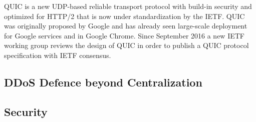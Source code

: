 QUIC is a new UDP-based reliable transport protocol with build-in security and
optimized for HTTP/2 that is now under standardization by the IETF. QUIC was
originally proposed by Google and has already seen large-scale deployment for
Google services and in Google Chrome. Since September 2016 a new IETF working
group reviews the design of QUIC in order to publish a QUIC protocol
specification \cite{draft-ietf-quic-transport} with IETF consensus.




\subsection{DDoS Defence beyond Centralization}

\subsection{Security}

